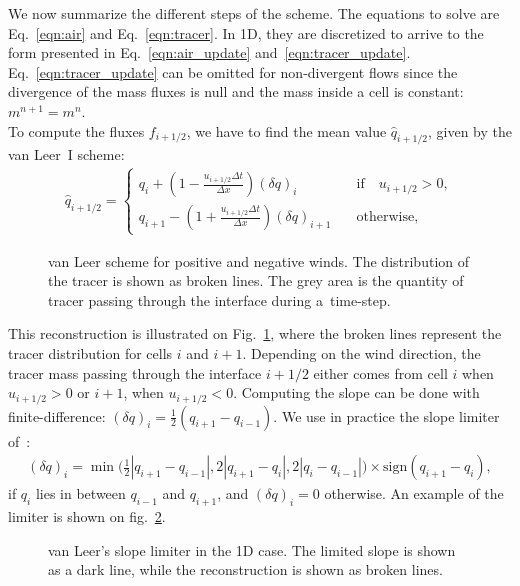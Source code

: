 We now summarize the different steps of the scheme. The equations to solve are
Eq.~\eqref{eqn:air} and Eq.~\eqref{eqn:tracer}. In 1D, they are discretized to
arrive to the form presented in Eq.~\eqref{eqn:air_update}
and~\eqref{eqn:tracer_update}. Eq.~\eqref{eqn:tracer_update} can be omitted for
non-divergent flows since the divergence of the mass fluxes is null and the
mass inside a cell is constant: $m^{n+1} = m^{n}$. \\
To compute the fluxes $f_{i+1/2}$, we have to find the mean value
$\widehat{q}_{i+1/2}$, given by the van Leer~I scheme:
\begin{align}
 \widehat{q}_{i+1/2} =
  \begin{cases}
    q_i + \left(1 -  \frac{u_{i+1/2} \Delta t}{\Delta x}\right){(\delta q)}_i
    \quad &\text{if} \quad u_{i+1/2} > 0,\\
    q_{i+1} - \left(1 + \frac{u_{i+1/2} \Delta t}{\Delta x}\right) {(\delta q)}_{i+1}
    \quad &\text{otherwise},
  \end{cases}
\label{eqn:vanleer1}
\end{align}
\begin{figure}
  \centering
  \caption{van Leer scheme for positive and negative winds. The
  distribution of the tracer is shown as broken lines. The grey area is the
  quantity of tracer passing through the interface during a~time-step.}
\label{fig:van_leer}
\end{figure}
This reconstruction is illustrated on Fig.~\ref{fig:van_leer}, where the broken
lines represent the tracer distribution for cells $i$ and $i+1$. Depending on
the wind direction, the tracer mass passing through the interface $i+1/2$ either
comes from cell $i$ when $u_{i+1/2} > 0$ or $i+1$, when $u_{i+1/2} < 0$. 
Computing the slope can be done with finite-difference:
  ${(\delta q)}_i = \frac{1}{2} (q_{i+1}-q_{i-1})$.
We use in practice the slope limiter of~\cite{Leer1979}:
\begin{align}
  {(\delta q)}_i =
  \min\big(\frac{1}{2} |q_{i+1}-q_{i-1}|, 2|q_{i+1}-q_i|, 2|q_i-q_{i-1}|\big)
  \times \text{sign}(q_{i+1} - q_i),
\label{eqn:slope}
\end{align}
if $q_i$ lies in between $q_{i-1}$ and $q_{i+1}$, and ${(\delta q)}_i =0$
otherwise. An example of the limiter is shown on fig.~\ref{fig:slope_limit}.
\begin{figure}
  \hfill
  \caption{van Leer's slope limiter in the 1D case. The limited slope is shown
  as a dark line, while the reconstruction is shown as broken lines.}
\label{fig:slope_limit}
\end{figure}

